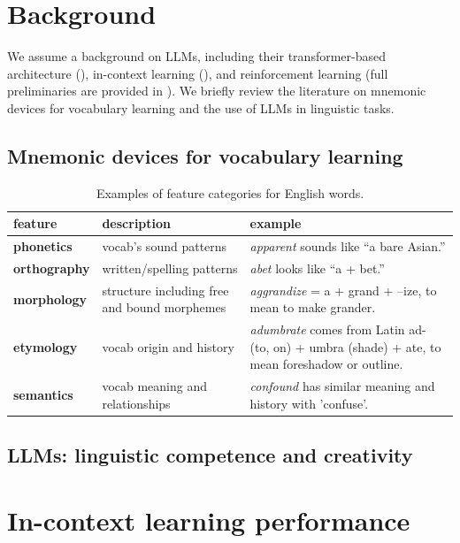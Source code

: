 \documentclass[11pt]{article}
\begin{document}
\section{Background}

We assume a background on LLMs, including their transformer-based architecture (), in-context learning (), and reinforcement learning (full preliminaries are provided in ). We briefly review the literature on mnemonic devices for vocabulary learning and the use of LLMs in linguistic tasks.

\subsection{Mnemonic devices for vocabulary learning}

\begin{table}[htb]
\centering
\caption{Examples of feature categories for English words.}
\label{tab:linguistic-features}
\begin{tabularx}{\textwidth}{l >{\raggedright\arraybackslash}X >{\raggedright\arraybackslash}X}
\toprule
\textbf{feature} & \textbf{description} & \textbf{example} \\
\midrule
\textbf{phonetics} & vocab's sound patterns & \emph{apparent} sounds like “a bare Asian.” \\
\addlinespace
\textbf{orthography} & written/spelling patterns & \emph{abet} looks like “a + bet.” \\
\addlinespace
\textbf{morphology} & structure including free and bound morphemes & \emph{aggrandize} = a + grand + –ize, to mean to make grander. \\
\addlinespace
\textbf{etymology} & vocab origin and history & \emph{adumbrate} comes from Latin ad- (to, on) + umbra (shade) + ate, to mean foreshadow or outline. \\
\addlinespace
\textbf{semantics} & vocab meaning and relationships & \emph{confound} has similar meaning and history with 'confuse'. \\
\bottomrule
\end{tabularx}
\end{table}

\subsection{LLMs: linguistic competence and creativity}

\section{In-context learning performance} \label{sec:icl-performance}
\end{document}
